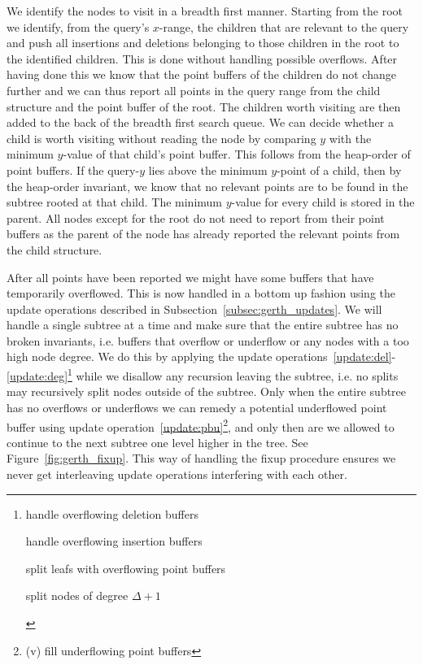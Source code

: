 \documentclass[twoside,11pt,openright]{report}
\begin{document}
We identify the nodes to visit in a breadth first manner.
Starting from the root we identify, from the query's $x$-range, the children that are relevant to the query and push all insertions and deletions belonging to those children in the root to the identified children. This is done without handling possible overflows. After having done this we know that the point buffers of the children do not change further and we can thus report all points in the query range from the child structure and the point buffer of the root. The children worth visiting are then added to the back of the breadth first search queue. We can decide whether a child is worth visiting without reading the node by comparing $y$ with the minimum $y$-value of that child's point buffer. This follows from the heap-order of point buffers. If the query-$y$ lies above the minimum $y$-point of a child, then by the heap-order invariant, we know that no relevant points are to be found in the subtree rooted at that child. The minimum $y$-value for every child is stored in the parent.
All nodes except for the root do not need to report from their point buffers as the parent of the node has already reported the relevant points from the child structure.

After all points have been reported we might have some buffers that have temporarily overflowed. This is now handled in a bottom up fashion using the update operations described in Subsection~\ref{subsec:gerth_updates}. We will handle a single subtree at a time and make sure that the entire subtree has no broken invariants, i.e. buffers that overflow or underflow or any nodes with a too high node degree. We do this by applying the update operations~\ref{update:del}-\ref{update:deg}\footnote{\begin{inlinelist}
	\item handle overflowing deletion buffers
	\item handle overflowing insertion buffers
	\item split leafs with overflowing point buffers
	\item split nodes of degree $\Delta+1$
\end{inlinelist}
} while we disallow any recursion leaving the subtree, i.e. no splits may recursively split nodes outside of the subtree. Only when the entire subtree has no overflows or underflows we can remedy a potential underflowed point buffer using update operation~\ref{update:pbu}\footnote{(v) fill underflowing point buffers}, and only then are we allowed to continue to the next subtree one level higher in the tree. See Figure~\ref{fig:gerth_fixup}. This way of handling the fixup procedure ensures we never get interleaving update operations interfering with each other.
\end{document}
